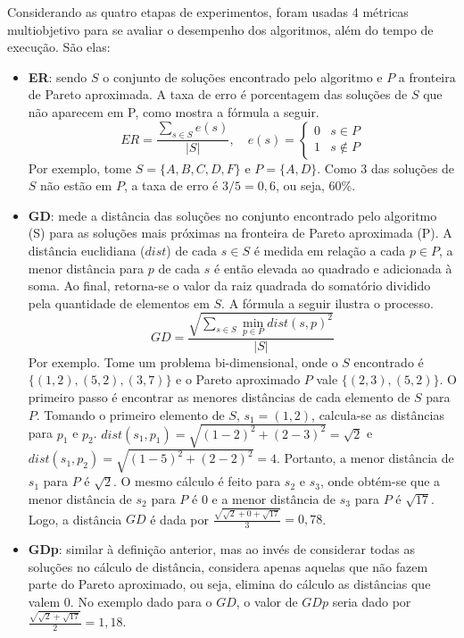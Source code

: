 Considerando as quatro etapas de experimentos, foram usadas 4 métricas multiobjetivo para se avaliar o desempenho dos algoritmos, além do tempo de execução. São elas:

\begin{itemize}
	\item \textbf{\ac{ER}}: sendo $S$ o conjunto de soluções encontrado pelo algoritmo e $P$ a fronteira de Pareto aproximada. A taxa de erro é porcentagem das soluções de $S$ que não aparecem em P, como mostra a fórmula a seguir.
	\begin{equation}
		ER = \frac{\sum\limits_{s \in S} e(s)}{|S|}, \quad
		e(s) = 
		\begin{cases} 
			0 & s \in P \\
			1 & s \notin P
		\end{cases}
	\end{equation}
	Por exemplo, tome $S=\{A, B, C, D, F\}$ e $P=\{A,D\}$. Como 3 das soluções de $S$ não estão em $P$, a taxa de erro é $3/5=0,6$, ou seja, 60\%.
	\item \textbf{\ac{GD}}: mede a distância das soluções no conjunto encontrado pelo algoritmo (S) para as soluções mais próximas na fronteira de Pareto aproximada (P). A distância euclidiana ($dist$) de cada $s \in S$ é medida em relação a cada $p \in P$, a menor distância para $p$ de cada $s$ é então elevada ao quadrado e adicionada à soma. Ao final, retorna-se o valor da raiz quadrada do somatório dividido pela quantidade de elementos em $S$. A fórmula a seguir ilustra o processo.
	\begin{equation}GD = \frac{\sqrt{\sum\limits_{s \in S} \min\limits_{p \in P} dist(s, p)^2}}{|S|}\end{equation}
	Por exemplo. Tome um problema bi-dimensional, onde o $S$ encontrado é $\{(1,2), (5,2), (3,7)\}$ e o Pareto aproximado $P$ vale $\{(2,3), (5,2)\}$. O primeiro passo é encontrar as menores distâncias de cada elemento de $S$ para $P$. Tomando o primeiro elemento de $S$, $s_1=(1,2)$, calcula-se as distâncias para $p_1$ e $p_2$. $dist(s_1, p_1)=\sqrt{(1-2)^2 + (2-3)^2}=\sqrt{2}$ e $dist(s_1, p_2)=\sqrt{(1-5)^2 + (2-2)^2}=4$. Portanto, a menor distância de $s_1$ para $P$ é $\sqrt{2}$. O mesmo cálculo é feito para $s_2$ e $s_3$, onde obtém-se que a menor distância de $s_2$ para $P$ é 0 e a menor distância de $s_3$ para $P$ é $\sqrt{17}$. Logo, a distância $GD$ é dada por $\frac{\sqrt{\sqrt{2} + 0 + \sqrt{17}}}{3}=0,78$.
	\item \textbf{\ac{GDp}}: similar à definição anterior, mas ao invés de considerar todas as soluções no cálculo de distância, considera apenas aquelas que não fazem parte do Pareto aproximado, ou seja, elimina do cálculo as distâncias que valem 0. No exemplo dado para o $GD$, o valor de $GDp$ seria dado por $\frac{\sqrt{\sqrt{2} + \sqrt{17}}}{2}=1,18$.

\end{itemize}
